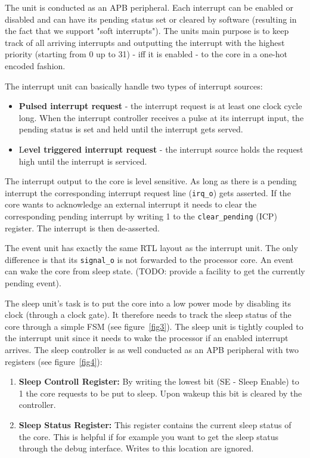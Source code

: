 The unit is conducted as an APB peripheral. Each interrupt can be enabled or disabled and can have its pending status set or cleared by software (resulting in the fact that we support "soft interrupts"). The units main purpose is to keep track of all arriving interrupts and outputting the interrupt with the highest priority (starting from 0 up to 31) - iff it is enabled -  to the core in a one-hot encoded fashion. 

The interrupt unit can basically handle two types of interrupt sources:

\begin{itemize}
    \item \textbf{Pulsed interrupt request} - the interrupt request is at least one clock cycle long. When the interrupt controller receives a pulse at its interrupt input, the pending status is set and held until the interrupt gets served.
    \item L\textbf{evel triggered interrupt request} - the interrupt source holds the request high until the interrupt is serviced.
\end{itemize}

The interrupt output to the core is level sensitive. As long as there is a pending interrupt the corresponding interrupt request line (\verb+irq_o+) gets asserted. If the core wants to acknowledge an external interrupt it needs to clear the corresponding pending interrupt by writing 1 to the \verb+clear_pending+ (ICP) register. The interrupt is then de-asserted.

The event unit has exactly the same RTL layout as the interrupt unit. The only difference is that its \verb+signal_o+ is not forwarded to the processor core. An event can wake the core from sleep state. (TODO: provide a facility to get the currently pending event).

The sleep unit's task is to put the core into a low power mode by disabling its clock (through a clock gate). It therefore needs to track the sleep status of the core through a simple FSM (see figure~\ref{fig3}). The sleep unit is tightly coupled to the interrupt unit since it needs to wake the processor if an enabled interrupt arrives.
The sleep controller is as well conducted as an APB peripheral with two registers (see figure~\ref{fig4}):

\begin{enumerate}
    \item \textbf{Sleep Controll Register:} By writing the lowest bit (SE - Sleep Enable) to 1 the core requests to be put to sleep. Upon wakeup this bit is cleared by the controller.
    \item \textbf{Sleep Status Register:} This register contains the current sleep status of the core. This is helpful if for example you want to get the sleep status through the debug interface. Writes to this location are ignored.
\end{enumerate}

